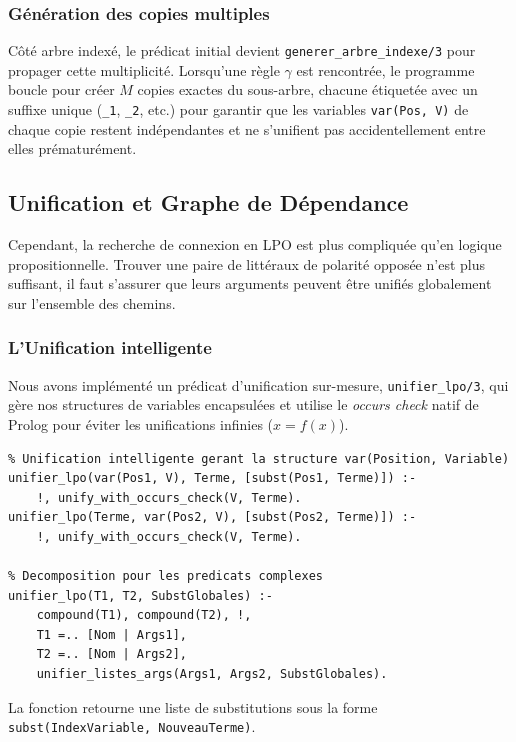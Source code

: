 \documentclass[12pt, a4paper]{article}
\begin{document}
\subsubsection{Génération des copies multiples}

Côté arbre indexé, le prédicat initial devient \texttt{generer\_arbre\_indexe/3} pour propager cette multiplicité. Lorsqu'une règle $\gamma$ est rencontrée, le programme boucle pour créer $M$ copies exactes du sous-arbre, chacune étiquetée avec un suffixe unique (\texttt{\_1}, \texttt{\_2}, etc.) pour garantir que les variables \texttt{var(Pos, V)} de chaque copie restent indépendantes et ne s'unifient pas accidentellement entre elles prématurément.

\subsection{Unification et Graphe de Dépendance}

Cependant, la recherche de connexion en LPO est plus compliquée qu'en logique propositionnelle. Trouver une paire de littéraux de polarité opposée n'est plus suffisant, il faut s'assurer que leurs arguments peuvent être unifiés globalement sur l'ensemble des chemins.

\subsubsection{L'Unification intelligente}

Nous avons implémenté un prédicat d'unification sur-mesure, \texttt{unifier\_lpo/3}, qui gère nos structures de variables encapsulées et utilise le \textit{occurs check} natif de Prolog pour éviter les unifications infinies ($x = f(x)$).

\begin{lstlisting}
% Unification intelligente gerant la structure var(Position, Variable)
unifier_lpo(var(Pos1, V), Terme, [subst(Pos1, Terme)]) :- 
    !, unify_with_occurs_check(V, Terme).
unifier_lpo(Terme, var(Pos2, V), [subst(Pos2, Terme)]) :- 
    !, unify_with_occurs_check(V, Terme).

% Decomposition pour les predicats complexes
unifier_lpo(T1, T2, SubstGlobales) :-
    compound(T1), compound(T2), !,
    T1 =.. [Nom | Args1],
    T2 =.. [Nom | Args2],
    unifier_listes_args(Args1, Args2, SubstGlobales).
\end{lstlisting}

La fonction retourne une liste de substitutions sous la forme \texttt{subst(IndexVariable, NouveauTerme)}.
\end{document}
